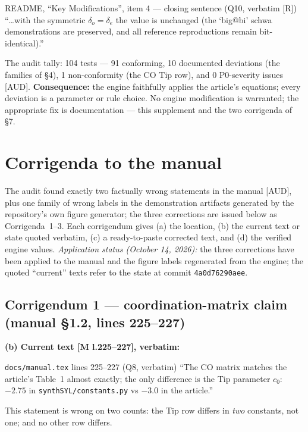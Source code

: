 \documentclass[11pt,letterpaper]{article}
\newcommand{\code}[1]{\texttt{#1}}
\begin{document}
\begin{qbox}{README, ``Key Modifications'', item 4 --- closing sentence
(Q10, verbatim [R])}
\small
``\dots with the symmetric $\delta_o = \delta_e$ the value is unchanged (the
`big@bi' schwa demonstrations are preserved, and all reference reproductions
remain bit-identical).''
\end{qbox}

\noindent The audit tally: 104 tests --- 91 conforming, 10 documented
deviations (the families of \S4), 1 non-conformity (the CO Tip row), and 0
P0-severity issues \hbox{[AUD]}. \textbf{Consequence:} the engine faithfully
applies the article's equations; every deviation is a parameter or rule
choice. No engine modification is warranted; the appropriate fix is
documentation --- this supplement and the two corrigenda of \S7.

\section{Corrigenda to the manual}

The audit found exactly two factually wrong statements in the manual
\hbox{[AUD]}, plus one family of wrong labels in the demonstration artifacts
generated by the repository's own figure generator; the three corrections are
issued below as Corrigenda~1--3. Each corrigendum gives (a) the location, (b)
the current text or state quoted verbatim, (c) a ready-to-paste corrected
text, and (d) the verified engine values. \emph{Application status (October
14, 2026):} the three corrections have been applied to the manual and the
figure labels regenerated from the engine; the quoted ``current'' texts
refer to the state at commit \code{4a0d76290aee}.

\subsection*{Corrigendum 1 --- coordination-matrix claim
(manual \S1.2, lines 225--227)}

\textbf{(b) Current text [M l.225--227], verbatim:}
\begin{qbox}{\code{docs/manual.tex} lines 225--227 (Q8, verbatim)}
\small
``The CO matrix matches the article's Table~1 almost exactly; the only
difference is the Tip parameter $c_0$: $-2.75$ in
\code{synthSYL/constants.py} vs $-3.0$ in the article.''
\end{qbox}
\noindent This statement is wrong on two counts: the Tip row differs in
\emph{two} constants, not one; and no other row differs.
\end{document}
